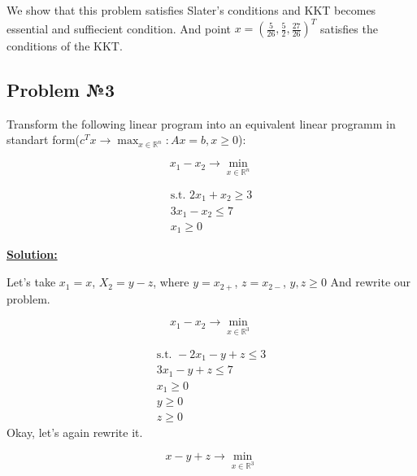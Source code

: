 We show that this problem satisfies Slater's conditions and KKT becomes essential and suffiecient condition. And point $x = \left( \frac{5}{26}, \frac{5}{2}, \frac{27}{26} \right)^T$ satisfies the conditions of the KKT.

\subsection{Problem №3}
Transform the following linear program into an equivalent linear programm in standart form($c^Tx \rightarrow \max_{x \in \mathds{R}^n} : Ax = b, x \geq 0$):


\begin{equation*}
    x_1 - x_2 \rightarrow \min_{x \in \mathds{R}^n}
\end{equation*}

\begin{equation*}
\begin{gathered}
    \text{s.t. } 2x_1 + x_2 \geq 3 \\
    3x_1 - x_2 \leq 7 \\
    x_1 \geq 0
\end{gathered}
\end{equation*}

\underline{\textbf{Solution:}}

Let's take $x_1 = x$, $X_2 = y - z$, where $y = x_{2+}$, $z = x_{2-}$, $y, z \geq 0$
And rewrite our problem.

\begin{equation*}
    x_1 - x_2 \rightarrow \min_{x \in \mathds{R}^3}
\end{equation*}

\begin{equation*}
\begin{gathered}
    \text{s.t. } -2x_1 - y + z \leq 3 \\
    3x_1 - y + z \leq 7 \\
    x_1 \geq 0 \\
    y \geq 0 \\
    z \geq 0
\end{gathered}
\end{equation*}
Okay, let's again rewrite it.

\begin{equation*}
    x - y + z \rightarrow \min_{x \in \mathds{R}^3}
\end{equation*}

